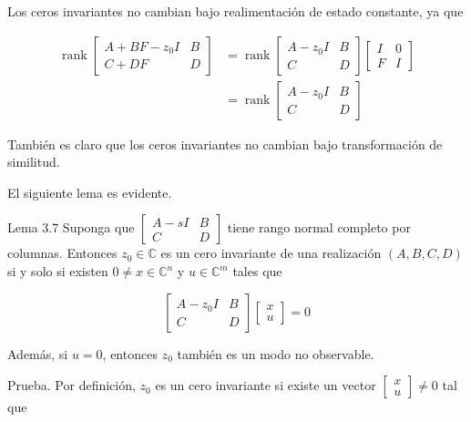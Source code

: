 Los ceros invariantes no cambian bajo realimentación de estado constante, ya que

$$
\begin{aligned}
\operatorname{rank}\left[\begin{array}{cc}
A+B F-z_{0} I & B \\
C+D F & D
\end{array}\right] & =\operatorname{rank}\left[\begin{array}{cc}
A-z_{0} I & B \\
C & D
\end{array}\right]\left[\begin{array}{cc}
I & 0 \\
F & I
\end{array}\right] \\
& =\operatorname{rank}\left[\begin{array}{cc}
A-z_{0} I & B \\
C & D
\end{array}\right]
\end{aligned}
$$

También es claro que los ceros invariantes no cambian bajo transformación de similitud.

El siguiente lema es evidente.

Lema 3.7 Suponga que $\left[\begin{array}{cc}A-s I & B \\ C & D\end{array}\right]$ tiene rango normal completo por columnas. Entonces $z_{0} \in \mathbb{C}$ es un cero invariante de una realización $(A, B, C, D)$ si y solo si existen $0 \neq x \in \mathbb{C}^{n}$ y $u \in \mathbb{C}^{m}$ tales que

$$
\left[\begin{array}{cc}
A-z_{0} I & B \\
C & D
\end{array}\right]\left[\begin{array}{l}
x \\
u
\end{array}\right]=0
$$

Además, si $u=0$, entonces $z_{0}$ también es un modo no observable.

Prueba. Por definición, $z_{0}$ es un cero invariante si existe un vector $\left[\begin{array}{l}x \\ u\end{array}\right] \neq 0$ tal que

